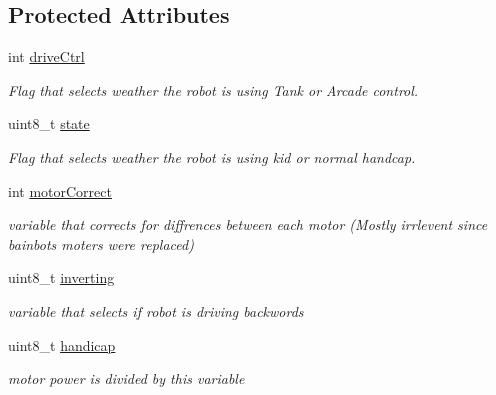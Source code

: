 \subsection*{Protected Attributes}
\begin{DoxyCompactItemize}
\item 
\mbox{\label{class_basic_drive_controller_a5ad8d9c49caf2e2e373e4ba61502e3a3}} 
int \mbox{\hyperlink{class_basic_drive_controller_a5ad8d9c49caf2e2e373e4ba61502e3a3}{drive\+Ctrl}}
\begin{DoxyCompactList}\small\item\em Flag that selects weather the robot is using Tank or Arcade control. \end{DoxyCompactList}\item 
\mbox{\label{class_basic_drive_controller_af07886b0094095fdbc490df4d06b0e33}} 
uint8\+\_\+t \mbox{\hyperlink{class_basic_drive_controller_af07886b0094095fdbc490df4d06b0e33}{state}}
\begin{DoxyCompactList}\small\item\em Flag that selects weather the robot is using kid or normal handcap. \end{DoxyCompactList}\item 
\mbox{\label{class_basic_drive_controller_a5ea443561f5c7f79d86264a8fa9f107f}} 
int \mbox{\hyperlink{class_basic_drive_controller_a5ea443561f5c7f79d86264a8fa9f107f}{motor\+Correct}}
\begin{DoxyCompactList}\small\item\em variable that corrects for diffrences between each motor (Mostly irrlevent since bainbots moters were replaced) \end{DoxyCompactList}\item 
\mbox{\label{class_basic_drive_controller_ae7b248880cef70b4e97037d9c0dcc00c}} 
uint8\+\_\+t \mbox{\hyperlink{class_basic_drive_controller_ae7b248880cef70b4e97037d9c0dcc00c}{inverting}}
\begin{DoxyCompactList}\small\item\em variable that selects if robot is driving backwords \end{DoxyCompactList}\item 
\mbox{\label{class_basic_drive_controller_af011f366ab009c2567c516575926b281}} 
uint8\+\_\+t \mbox{\hyperlink{class_basic_drive_controller_af011f366ab009c2567c516575926b281}{handicap}}
\begin{DoxyCompactList}\small\item\em motor power is divided by this variable \end{DoxyCompactList}\end{DoxyCompactItemize}


